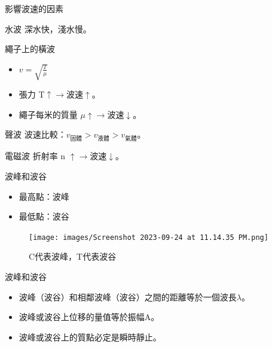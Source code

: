\documentclass[13pt]{beamer}
\begin{document}
\begin{frame}{影響波速的因素}
    \begin{exampleblock}{水波}
        深水快，淺水慢。
    \end{exampleblock}
    \begin{exampleblock}{繩子上的橫波}
        \begin{itemize}
            \item $\displaystyle v=\sqrt{\frac{T}{\mu}}$
            \item 張力 T$\uparrow \rightarrow$波速$\uparrow$。
            \item 繩子每米的質量 $\mu\uparrow \rightarrow$波速$\downarrow$。
        \end{itemize}
    \end{exampleblock}
    \begin{exampleblock}{聲波}
        波速比較：$v_{\texttt{固體}}>v_{\texttt{液體}}>v_{\texttt{氣體}}$。
    \end{exampleblock}

    \begin{exampleblock}{電磁波}
        折射率 n $\uparrow \rightarrow$波速$\downarrow$。
    \end{exampleblock}

\end{frame}

\begin{frame}{波峰和波谷}
    \begin{itemize}
        \item 最高點：波峰
        \item 最低點：波谷
    \end{itemize}
    \begin{figure}
        \centering
        \texttt{[image: images/Screenshot 2023-09-24 at 11.14.35 PM.png]}
        \caption{C代表波峰，T代表波谷}

    \end{figure}

\end{frame}

\begin{frame}{波峰和波谷}
    \begin{itemize}
        \item 波峰（波谷）和相鄰波峰（波谷）之間的距離等於一個波長$\lambda$。
        \item 波峰或波谷上位移的量值等於振幅A。
        \item 波峰或波谷上的質點必定是瞬時靜止。
    \end{itemize}
\end{frame}
\end{document}
